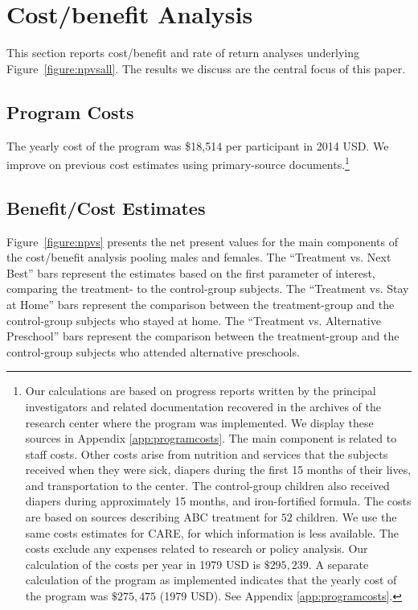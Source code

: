\section{Cost/benefit Analysis} \label{section:cbaresults}

This section reports cost/benefit and rate of return analyses underlying Figure~\ref{figure:npvsall}. The results we discuss are the central focus of this paper.

\subsection{Program Costs} \label{section:programscosts}

The yearly cost of the program was \$18,514 per participant in 2014 USD. We improve on previous cost estimates using primary-source documents.\footnote{Our calculations are based on progress reports written by the principal investigators and related documentation recovered in the archives of the research center where the program was implemented. We display these sources in Appendix \ref{app:programcosts}. The main component is related to staff costs. Other costs arise from nutrition and services that the subjects received when they were sick, diapers during the first 15 months of their lives, and transportation to the center. The control-group children also received diapers during approximately 15 months, and iron-fortified formula. The costs are based on sources describing ABC treatment for $52$ children. We use the same costs estimates for CARE, for which information is less available. The costs exclude any expenses related to research or policy analysis. Our calculation of the costs per year in 1979 USD is $\$295,239$. A separate calculation of the program as implemented indicates that the yearly cost of the program was $\$275,475$ (1979 USD). See Appendix \ref{app:programcosts}.}

\subsection{Benefit/Cost Estimates}

Figure~\ref{figure:npvs} presents the net present values for the main components of the cost/benefit analysis pooling males and females. The ``Treatment vs. Next Best'' bars represent the estimates based on the first parameter of interest, comparing the treatment- to the control-group subjects. The ``Treatment vs.  Stay at Home'' bars represent the comparison between the treatment-group and the control-group subjects who stayed at home. The ``Treatment vs. Alternative Preschool'' bars represent the comparison between the treatment-group and the control-group subjects who attended alternative preschools.


